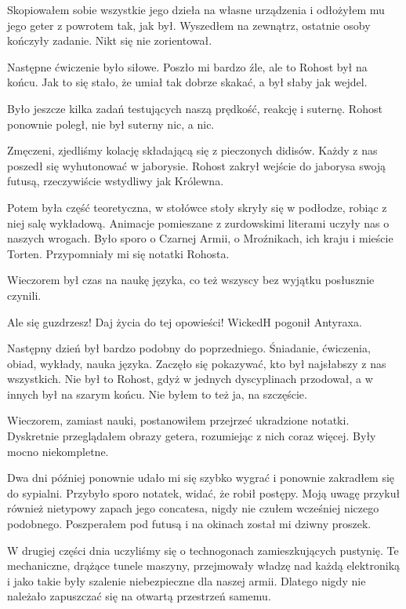 Skopiowałem sobie wszystkie jego dzieła na własne urządzenia i odłożyłem mu jego geter z powrotem tak, jak był.
Wyszedłem na zewnątrz, ostatnie osoby kończyły zadanie. Nikt się nie zorientował.

Następne ćwiczenie było siłowe. 
Poszło mi bardzo źle, ale to Rohost był na końcu.
Jak to się stało, że umiał tak dobrze skakać, a był słaby jak wejdel.

Było jeszcze kilka zadań testujących naszą prędkość, reakcję i suternę.
Rohost ponownie poległ, nie był suterny nic, a nic.

Zmęczeni, zjedliśmy kolację składającą się z pieczonych didisów.
Każdy z nas poszedł się wyhutonować w jaborysie.
Rohost zakrył wejście do jaborysa swoją futusą, rzeczywiście wstydliwy jak Królewna.

Potem była część teoretyczna, w stołówce stoły skryły się w podłodze, robiąc z niej salę wykładową.
Animacje pomieszane z zurdowskimi literami uczyły nas o naszych wrogach.
Było sporo o Czarnej Armii, o Mroźnikach, ich kraju i mieście Torten.
Przypomniały mi się notatki Rohosta.

Wieczorem był czas na naukę języka, co też wszyscy bez wyjątku posłusznie czynili.

\divider{}

\begin{dialogue}
\ds{} Ale się guzdrzesz! Daj życia do tej opowieści! \dm{} WickedH pogonił Antyraxa.
\end{dialogue}

\divider{}

Następny dzień był bardzo podobny do poprzedniego.
Śniadanie, ćwiczenia, obiad, wykłady, nauka języka.
Zaczęło się pokazywać, kto był najsłabszy z nas wszystkich.
Nie był to Rohost, gdyż w jednych dyscyplinach przodował, a w innych był na szarym końcu.
Nie byłem to też ja, na szczęście.

Wieczorem, zamiast nauki, postanowiłem przejrzeć ukradzione notatki.
Dyskretnie przeglądałem obrazy getera, rozumiejąc z nich coraz więcej.
Były mocno niekompletne.

Dwa dni później ponownie udało mi się szybko wygrać i ponownie zakradłem się do sypialni.
Przybyło sporo notatek, widać, że robił postępy.
Moją uwagę przykuł również nietypowy zapach jego concatesa, nigdy nie czułem wcześniej niczego podobnego.
Poszperałem pod futusą i na okinach został mi dziwny proszek.

W drugiej części dnia uczyliśmy się o technogonach zamieszkujących pustynię.
Te mechaniczne, drążące tunele maszyny, przejmowały władzę nad każdą elektroniką i jako takie były szalenie niebezpieczne dla naszej armii.
Dlatego nigdy nie należało zapuszczać się na otwartą przestrzeń samemu.

